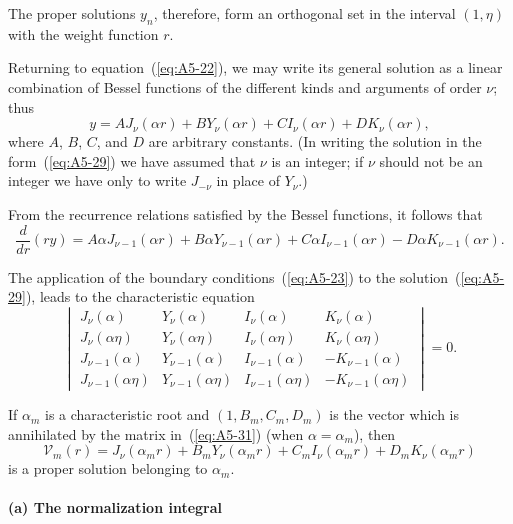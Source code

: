 The proper solutions $y_n$, therefore, form an orthogonal set in the interval
$(1, \eta)$ with the weight function $r$.

Returning to equation~(\ref{eq:A5-22}), we may write its general solution as a
linear combination of Bessel functions of the different kinds and
arguments of order $\nu$; thus
\begin{equation}
\label{eq:A5-29}
y = A J_\nu(\alpha r) + B Y_\nu(\alpha r) + C I_\nu(\alpha r) + D K_\nu(\alpha r),
\end{equation}
where $A$, $B$, $C$, and $D$ are arbitrary constants. (In writing the solution
in the form~(\ref{eq:A5-29}) we have assumed that $\nu$ is an integer; if $\nu$ should not
be an integer we have only to write $J_{-\nu}$ in place of $Y_\nu$.)

From the recurrence relations satisfied by the Bessel functions, it
follows that
\begin{equation}
\label{eq:A5-30}
\frac{d}{dr}(ry) = A\alpha J_{\nu-1}(\alpha r) + B\alpha Y_{\nu-1}(\alpha r) + C\alpha I_{\nu-1}(\alpha r) - D\alpha K_{\nu-1}(\alpha r).
\end{equation}

The application of the boundary conditions~(\ref{eq:A5-23}) to the solution~(\ref{eq:A5-29}), leads to the characteristic equation
\begin{equation}
\label{eq:A5-31}
\begin{vmatrix}
J_\nu(\alpha) & Y_\nu(\alpha) & I_\nu(\alpha) & K_\nu(\alpha) \\
J_\nu(\alpha\eta) & Y_\nu(\alpha\eta) & I_\nu(\alpha\eta) & K_\nu(\alpha\eta) \\
J_{\nu-1}(\alpha) & Y_{\nu-1}(\alpha) & I_{\nu-1}(\alpha) & -K_{\nu-1}(\alpha) \\
J_{\nu-1}(\alpha\eta) & Y_{\nu-1}(\alpha\eta) & I_{\nu-1}(\alpha\eta) & -K_{\nu-1}(\alpha\eta)
\end{vmatrix} = 0.
\end{equation}

If $\alpha_m$ is a characteristic root and $(1, B_m, C_m, D_m)$ is the vector which is
annihilated by the matrix in~(\ref{eq:A5-31}) (when $\alpha = \alpha_m$), then
\begin{equation}
\label{eq:A5-32}
\mathscr{V}_{m}(r) = J_\nu(\alpha_m r) + B_m Y_\nu(\alpha_m r) + C_m I_\nu(\alpha_m r) + D_m K_\nu(\alpha_m r)
\end{equation}
is a proper solution belonging to $\alpha_m$.

\paragraph{(a) The normalization integral}

